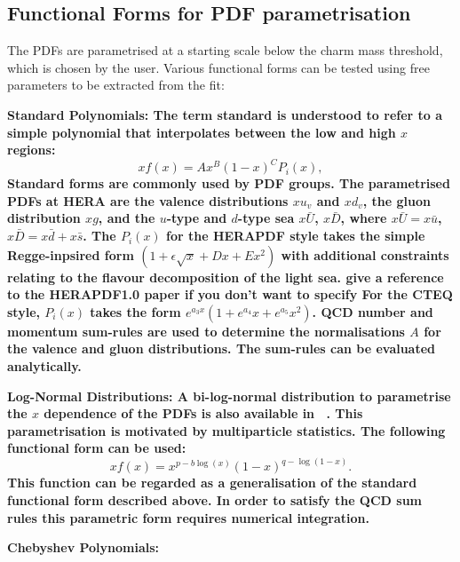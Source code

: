 \subsection{Functional Forms for PDF parametrisation}
The PDFs are parametrised at a starting scale below the charm mass threshold, which is chosen by the user. Various functional forms can be tested using free parameters to be extracted from the fit:
\begin{description}
\item \bf {Standard Polynomials:} \rm
The term standard is understood to refer to a simple polynomial 
that interpolates between the low and high $x$ regions:
\begin{equation}
 xf(x) = A x^{B} (1-x)^{C} P_i(x),
\label{eqn:pdf_std}
\end{equation}
Standard forms are commonly used by PDF groups.
The parametrised PDFs at HERA are the valence distributions
$xu_v$ and $xd_v$, the gluon distribution $xg$, and the $u$-type and $d$-type sea 
$x\bar{U}$, $x\bar{D}$, where $x\bar{U} = x\bar{u}$, 
$x\bar{D} = x\bar{d} +x\bar{s}$. 
The $P_i(x)$ for the HERAPDF style takes the simple Regge-inpsired form  
$(1 + \epsilon \sqrt{x} + D x + E x^2)$
with additional constraints relating to the flavour decomposition of the 
light sea. {\bf give a reference to the HERAPDF1.0 paper if you don't want to specify} 
For the CTEQ style, $P_i(x)$ takes the form $e^{a_3x} (1 + e^{a_4} x + e^{a_5} x^2)$.
QCD number and momentum sum-rules are used to determine the normalisations $A$ for the valence and gluon distributions. 
The sum-rules can be evaluated analytically.

\item \bf {Log-Normal Distributions:} \rm
A bi-log-normal distribution to parametrise the $x$ dependence of the PDFs is 
also available in \fitter\ .
This parametrisation is motivated by  multiparticle statistics.
The following functional form can be used:
\begin{equation}
 xf(x)=x^{p-b\log(x)}(1-x)^{q-\log(1-x)}.
\end{equation}
This function can be regarded as a generalisation of the standard functional form described above. 
In order to satisfy the QCD sum rules this parametric form requires numerical integration.

\item \bf {Chebyshev Polynomials:} \rm


\end{description}
